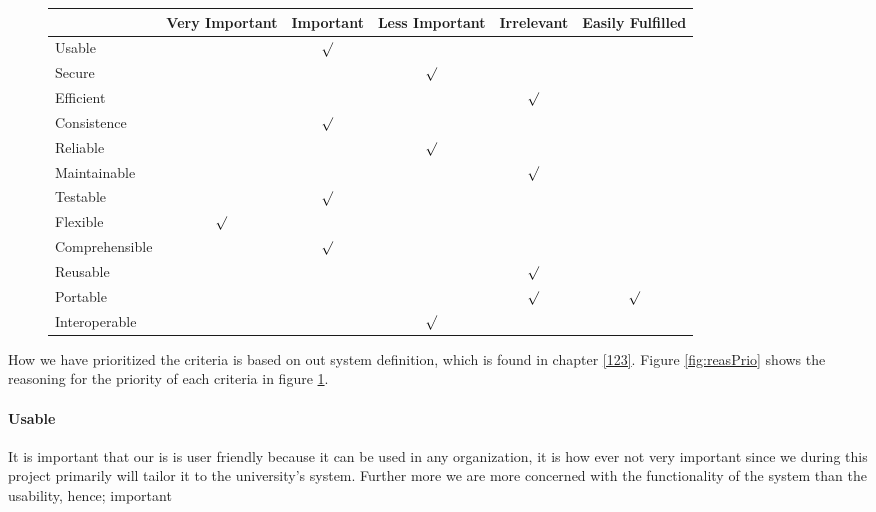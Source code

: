\begin{figure}[htbp]
	\centering
		\begin{tabular}{| l | m{} | m{}| m{}| m{}|m{}|} \hline
		  & Very  Important & Important & Less Important & Irrelevant & Easily Fulfilled \\ \hline
		Usable  & & \multicolumn{1}{c|}{$\surd$} & & & \\ \hline
		Secure  & & & \multicolumn{1}{c|}{$\surd$} & & \\ \hline
		Efficient & & & & \multicolumn{1}{c|}{$\surd$} & \\ \hline
		Consistence  & & \multicolumn{1}{c|}{$\surd$} & & & \\ \hline
		Reliable  & & & \multicolumn{1}{c|}{$\surd$} & & \\ \hline
		Maintainable  & & & & \multicolumn{1}{c|}{$\surd$} & \\ \hline
		Testable  & & \multicolumn{1}{c|}{$\surd$} & & & \\ \hline
		Flexible  & \multicolumn{1}{c|}{$\surd$} & & & & \\ \hline
		Comprehensible  & & \multicolumn{1}{c|}{$\surd$} & & & \\ \hline
		Reusable  & & & & \multicolumn{1}{c|}{$\surd$} & \\ \hline
		Portable & & & & \multicolumn{1}{c|}{$\surd$} & \multicolumn{1}{c|}{$\surd$} \\ \hline
		Interoperable & & & \multicolumn{1}{c|}{$\surd$} & & \\ \hline
		\end{tabular}
	\label{fig:prioritizedCrit}
\end{figure}

How we have prioritized the criteria is based on out system definition, which is found in chapter \ref{123}. Figure \ref{fig:reasPrio} shows the reasoning for the priority of each criteria in figure \ref{fig:prioritizedCrit}.

\paragraph{Usable}
It is important that our \hdesk[] is is user friendly because it can be used in any organization, it is how ever not very important since we during this project primarily will tailor it to the university's system.
Further more we are more concerned with the functionality of the system than the usability, hence; important 
